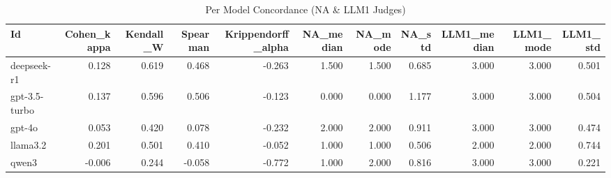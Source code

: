 \begin{table}
\caption{Per Model Concordance (NA & LLM1 Judges)}
\label{tab:per_model_concordance_NA_LLM1_judges}
\begin{tabular}{lrrrrrrrrrr}
\toprule
Id & Cohen_kappa & Kendall_W & Spearman & Krippendorff_alpha & NA_median & NA_mode & NA_std & LLM1_median & LLM1_mode & LLM1_std \\
\midrule
deepseek-r1 & 0.128 & 0.619 & 0.468 & -0.263 & 1.500 & 1.500 & 0.685 & 3.000 & 3.000 & 0.501 \\
gpt-3.5-turbo & 0.137 & 0.596 & 0.506 & -0.123 & 0.000 & 0.000 & 1.177 & 3.000 & 3.000 & 0.504 \\
gpt-4o & 0.053 & 0.420 & 0.078 & -0.232 & 2.000 & 2.000 & 0.911 & 3.000 & 3.000 & 0.474 \\
llama3.2 & 0.201 & 0.501 & 0.410 & -0.052 & 1.000 & 1.000 & 0.506 & 2.000 & 2.000 & 0.744 \\
qwen3 & -0.006 & 0.244 & -0.058 & -0.772 & 1.000 & 2.000 & 0.816 & 3.000 & 3.000 & 0.221 \\
\bottomrule
\end{tabular}
\end{table}
